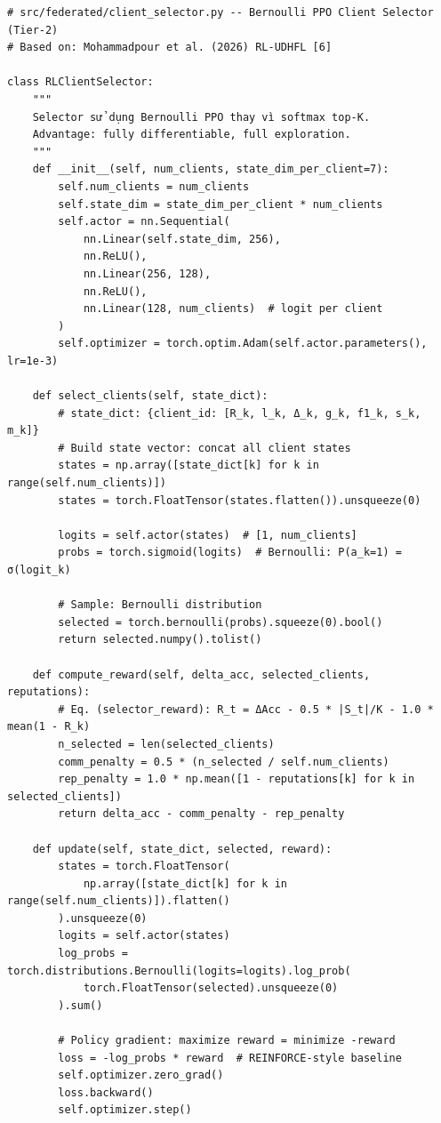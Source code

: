 \documentclass[12pt,a4paper]{article}
\begin{document}
\begin{lstlisting}[caption=RL Client Selector (Tier-2), label=lst:selector]
# src/federated/client_selector.py -- Bernoulli PPO Client Selector (Tier-2)
# Based on: Mohammadpour et al. (2026) RL-UDHFL [6]

class RLClientSelector:
    """
    Selector sử dụng Bernoulli PPO thay vì softmax top-K.
    Advantage: fully differentiable, full exploration.
    """
    def __init__(self, num_clients, state_dim_per_client=7):
        self.num_clients = num_clients
        self.state_dim = state_dim_per_client * num_clients
        self.actor = nn.Sequential(
            nn.Linear(self.state_dim, 256),
            nn.ReLU(),
            nn.Linear(256, 128),
            nn.ReLU(),
            nn.Linear(128, num_clients)  # logit per client
        )
        self.optimizer = torch.optim.Adam(self.actor.parameters(), lr=1e-3)

    def select_clients(self, state_dict):
        # state_dict: {client_id: [R_k, l_k, Δ_k, g_k, f1_k, s_k, m_k]}
        # Build state vector: concat all client states
        states = np.array([state_dict[k] for k in range(self.num_clients)])
        states = torch.FloatTensor(states.flatten()).unsqueeze(0)

        logits = self.actor(states)  # [1, num_clients]
        probs = torch.sigmoid(logits)  # Bernoulli: P(a_k=1) = σ(logit_k)

        # Sample: Bernoulli distribution
        selected = torch.bernoulli(probs).squeeze(0).bool()
        return selected.numpy().tolist()

    def compute_reward(self, delta_acc, selected_clients, reputations):
        # Eq. (selector_reward): R_t = ΔAcc - 0.5 * |S_t|/K - 1.0 * mean(1 - R_k)
        n_selected = len(selected_clients)
        comm_penalty = 0.5 * (n_selected / self.num_clients)
        rep_penalty = 1.0 * np.mean([1 - reputations[k] for k in selected_clients])
        return delta_acc - comm_penalty - rep_penalty

    def update(self, state_dict, selected, reward):
        states = torch.FloatTensor(
            np.array([state_dict[k] for k in range(self.num_clients)]).flatten()
        ).unsqueeze(0)
        logits = self.actor(states)
        log_probs = torch.distributions.Bernoulli(logits=logits).log_prob(
            torch.FloatTensor(selected).unsqueeze(0)
        ).sum()

        # Policy gradient: maximize reward = minimize -reward
        loss = -log_probs * reward  # REINFORCE-style baseline
        self.optimizer.zero_grad()
        loss.backward()
        self.optimizer.step()
\end{lstlisting}
\end{document}
